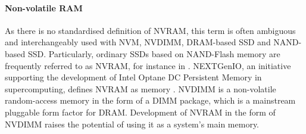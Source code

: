 \documentclass[thesis-en.tex]{subfiles}
\begin{document}

\paragraph{Non-volatile RAM}
As there is no standardised definition of NVRAM, this term is often ambiguous and interchangeably used with NVM, NVDIMM, DRAM-based SSD and NAND-based SSD. Particularly, ordinary SSDs based on NAND-Flash memory are frequently referred to as NVRAM, for instance in \cite{osti_1544343}. NEXTGenIO, an initiative supporting the development of Intel Optane DC Persistent Memory in supercomputing, defines NVRAM as memory  \cite{nextgenio}. NVDIMM is a non-volatile random-access memory in the form of a DIMM package, which is a mainstream pluggable form factor for DRAM. Development of NVRAM in the form of NVDIMM raises the potential of using it as a system's main memory.
\end{document}
